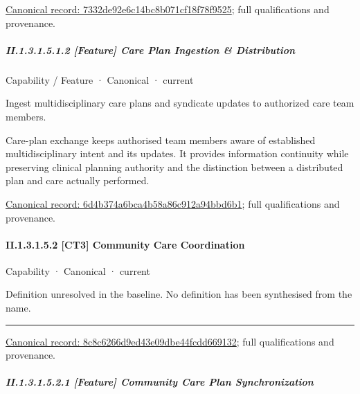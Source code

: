 {\footnotesize \href{../../../../continuum/strategy/capability/feature/7332de92e6c14bc8b071cf18f78f9525.md}{Canonical record: 7332de92e6c14bc8b071cf18f78f9525}; full qualifications and provenance.}\par
\subparagraph*{II.1.3.1.5.1.2 [Feature] Care Plan Ingestion \& Distribution}
\label{navigation:II.1.3.1.5.1.2}

\label{element:6d4b374a6bca4b58a86c912a94bbd6b1}
{\small Capability / Feature · Canonical · current}\par

Ingest multidisciplinary care plans and syndicate updates to authorized care team members.



Care-plan exchange keeps authorised team members aware of established multidisciplinary intent and its updates. It provides information continuity while preserving clinical planning authority and the distinction between a distributed plan and care actually performed.


{\footnotesize \href{../../../../continuum/strategy/capability/feature/6d4b374a6bca4b58a86c912a94bbd6b1.md}{Canonical record: 6d4b374a6bca4b58a86c912a94bbd6b1}; full qualifications and provenance.}\par
\paragraph*{II.1.3.1.5.2 [CT3] Community Care Coordination}
\label{navigation:II.1.3.1.5.2}

\label{element:8c8c6266d9ed43e09dbe44fcdd669132}
{\small Capability · Canonical · current}\par

Definition unresolved in the baseline. No definition has been synthesised from the name.



\medskip\hrule\medskip

{\footnotesize \href{../../../../continuum/strategy/capability/8c8c6266d9ed43e09dbe44fcdd669132.md}{Canonical record: 8c8c6266d9ed43e09dbe44fcdd669132}; full qualifications and provenance.}\par
\subparagraph*{II.1.3.1.5.2.1 [Feature] Community Care Plan Synchronization}
\label{navigation:II.1.3.1.5.2.1}

